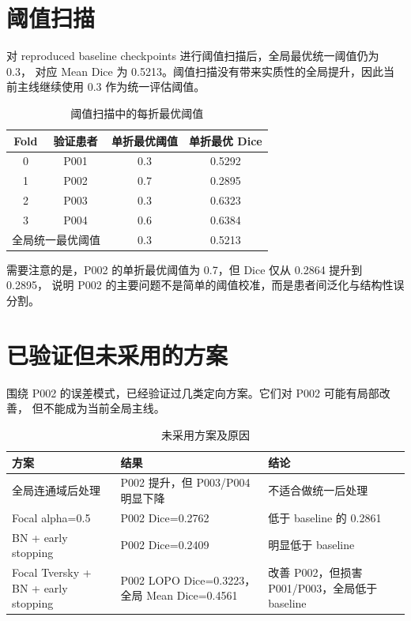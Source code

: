 \documentclass[UTF8,11pt]{ctexart}
\begin{document}
\section{阈值扫描}

对 reproduced baseline checkpoints 进行阈值扫描后，全局最优统一阈值仍为 0.3，
对应 Mean Dice 为 0.5213。阈值扫描没有带来实质性的全局提升，因此当前主线继续使用
0.3 作为统一评估阈值。

\begin{table}[htbp]
\centering
\caption{阈值扫描中的每折最优阈值}
\begin{tabular}{cccc}
\toprule
Fold & 验证患者 & 单折最优阈值 & 单折最优 Dice \\
\midrule
0 & P001 & 0.3 & 0.5292 \\
1 & P002 & 0.7 & 0.2895 \\
2 & P003 & 0.3 & 0.6323 \\
3 & P004 & 0.6 & 0.6384 \\
\midrule
\multicolumn{2}{r}{全局统一最优阈值} & 0.3 & 0.5213 \\
\bottomrule
\end{tabular}
\end{table}

需要注意的是，P002 的单折最优阈值为 0.7，但 Dice 仅从 0.2864 提升到 0.2895，
说明 P002 的主要问题不是简单的阈值校准，而是患者间泛化与结构性误分割。

\section{已验证但未采用的方案}

围绕 P002 的误差模式，已经验证过几类定向方案。它们对 P002 可能有局部改善，
但不能成为当前全局主线。

\begin{table}[htbp]
\centering
\caption{未采用方案及原因}
\begin{tabular}{p{}p{}p{}}
\toprule
方案 & 结果 & 结论 \\
\midrule
全局连通域后处理 & P002 提升，但 P003/P004 明显下降 & 不适合做统一后处理 \\
Focal alpha=0.5 & P002 Dice=0.2762 & 低于 baseline 的 0.2861 \\
BN + early stopping & P002 Dice=0.2409 & 明显低于 baseline \\
Focal Tversky + BN + early stopping & P002 LOPO Dice=0.3223，全局 Mean Dice=0.4561 & 改善 P002，但损害 P001/P003，全局低于 baseline \\
\bottomrule
\end{tabular}
\end{table}
\end{document}
